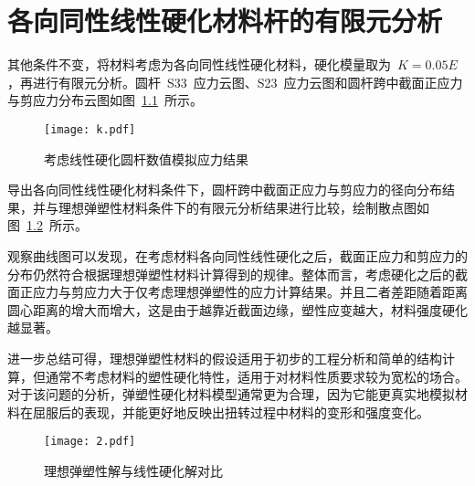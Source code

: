 \chapter{各向同性线性硬化材料杆的有限元分析}
\label{cha:abaqus_hardened}
其他条件不变，将材料考虑为各向同性线性硬化材料，硬化模量取为~{$K=0.05E$}，再进行有限元分析。圆杆~S33~应力云图、S23~应力云图和圆杆跨中截面正应力与剪应力分布云图如图~\ref{fig:k}~所示。
\begin{figure}[htbp]
    \centering
	\texttt{[image: k.pdf]}
    \caption{考虑线性硬化圆杆数值模拟应力结果}
    \label{fig:k}
\end{figure}

导出各向同性线性硬化材料条件下，圆杆跨中截面正应力与剪应力的径向分布结果，并与理想弹塑性材料条件下的有限元分析结果进行比较，绘制散点图如图~\ref{fig:ks3323}~所示。

观察曲线图可以发现，在考虑材料各向同性线性硬化之后，截面正应力和剪应力的分布仍然符合根据理想弹塑性材料计算得到的规律。整体而言，考虑硬化之后的截面正应力与剪应力大于仅考虑理想弹塑性的应力计算结果。并且二者差距随着距离圆心距离的增大而增大，这是由于越靠近截面边缘，塑性应变越大，材料强度硬化越显著。

进一步总结可得，理想弹塑性材料的假设适用于初步的工程分析和简单的结构计算，但通常不考虑材料的塑性硬化特性，适用于对材料性质要求较为宽松的场合\cite{Mohr2008,Hill1950}。对于该问题的分析，弹塑性硬化材料模型通常更为合理，因为它能更真实地模拟材料在屈服后的表现，并能更好地反映出扭转过程中材料的变形和强度变化。
\begin{figure}[htbp]
    \centering
	\texttt{[image: 2.pdf]}
    \caption{理想弹塑性解与线性硬化解对比}
    \label{fig:ks3323}
\end{figure}